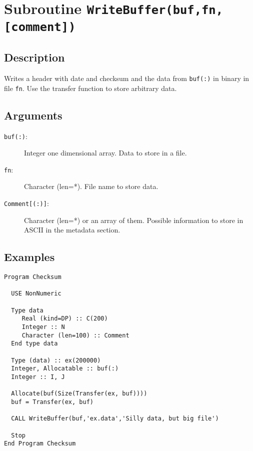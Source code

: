 \section{Subroutine \texttt{WriteBuffer(buf,fn,[comment])}}

\subsection{Description}

Writes a header with date and checksum and the data from
\texttt{buf(:)} in binary in file \texttt{fn}. Use
the transfer function to store arbitrary data.

\subsection{Arguments}

\begin{description}
\item[\texttt{buf(:)}: ] Integer one dimensional array. Data to
  store in a file.
\item[\texttt{fn}: ] Character (len=*). File name to store data.
\item[\texttt{Comment[(:)]}: ] Character (len=*) or an array of
  them. Possible information to store in ASCII in the metadata section.
\end{description}

\subsection{Examples}

\begin{lstlisting}[emph=NumberOfColumns,
                   emphstyle=\color{blue},
                   frame=trBL,
                   caption=Stoing data on a file.,
                   label=nol]
Program Checksum
 
  USE NonNumeric
 
  Type data
     Real (kind=DP) :: C(200)
     Integer :: N
     Character (len=100) :: Comment
  End type data
 
  Type (data) :: ex(200000)
  Integer, Allocatable :: buf(:)
  Integer :: I, J
 
  Allocate(buf(Size(Transfer(ex, buf))))
  buf = Transfer(ex, buf)
 
  CALL WriteBuffer(buf,'ex.data','Silly data, but big file')
 
  Stop
End Program Checksum
\end{lstlisting}

